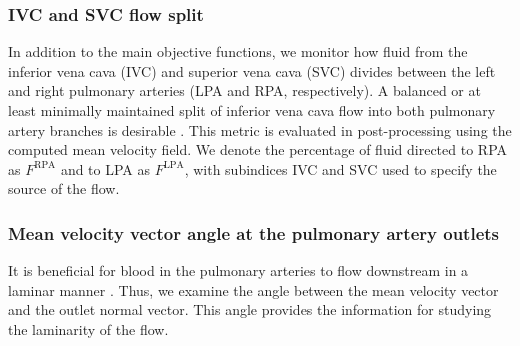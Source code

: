 \subsubsection*{IVC and SVC flow split}
In addition to the main objective functions, we monitor how fluid from the inferior vena cava (IVC) and superior vena cava (SVC) divides between the left and right pulmonary arteries  (LPA and RPA, respectively). A balanced or at least minimally maintained split of inferior vena cava flow into both pulmonary artery branches is desirable \cite{Rajagopal2021}. This metric is evaluated in post-processing using the computed mean velocity field. We denote the percentage of fluid directed to RPA as $F^{\text{RPA}}$ and to LPA as $F^{\text{LPA}}$, with subindices IVC and SVC used to specify the source of the flow.

\subsubsection*{Mean velocity vector angle at the pulmonary artery outlets}
It is beneficial for blood in the pulmonary arteries to flow downstream in a laminar manner \cite{Rijnberg2018}. Thus, we examine the angle between the mean velocity vector and the outlet normal vector. This angle provides the information  for studying the laminarity of the flow.
